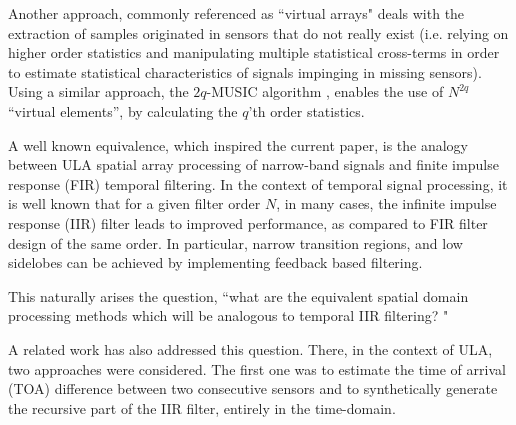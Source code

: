 \par Another approach, commonly referenced as ``virtual arrays" \cite{Pal2010NestedFreedom,Chevalier2005OnProcessing,Mendel1999ApplicationsProcessing} deals with the extraction of samples originated in sensors that do not really exist (i.e. relying on higher order statistics and manipulating multiple statistical cross-terms in order to estimate statistical characteristics of signals impinging in missing sensors). 
Using a similar approach, the $2q$-MUSIC algorithm \cite{Chevalier2006High-resolutionAlgorithm} , enables the use of $N^{2q}$ ``virtual elements'', by calculating the $q$'th order statistics. 
\par A well known \cite{VanVeenBeamforming:Filtering} equivalence, which inspired the current paper, is the analogy between ULA spatial array processing of narrow-band signals and finite impulse response (FIR) temporal filtering. 
In the context of temporal signal processing, it is well known that for a given filter order $N$, in many cases, the infinite impulse response (IIR) filter leads to improved performance, as compared to FIR filter design of the same order. In particular, narrow transition regions, and low sidelobes can be achieved by implementing feedback based filtering. 
\par This naturally arises the question, ``what are the equivalent spatial domain processing methods which will be analogous to temporal IIR filtering? " 
\par A related work \cite{Wen2013ExtendingStructure} has also addressed this question. 
There, in the context of ULA, two approaches were considered. 
The first one was to estimate the time of arrival (TOA) difference between two consecutive sensors and to synthetically generate the recursive part of the IIR filter, entirely in the time-domain. 

